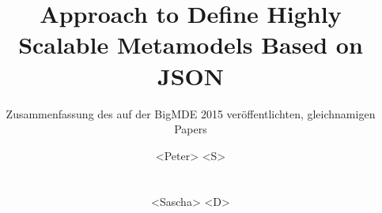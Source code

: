 \documentclass[ngerman]{ewks-latex}
\begin{document}
\title{Approach to Define Highly Scalable Metamodels Based on JSON}

\subtitle{Zusammenfassung des auf der BigMDE 2015 veröffentlichten, gleichnamigen Papers}

\author{
	\alignauthor
	<Peter> <S>\\
	\\
    \\
	\alignauthor
	<Sascha> <D>\\
	\\
    \\
}

\maketitle

\end{document}
